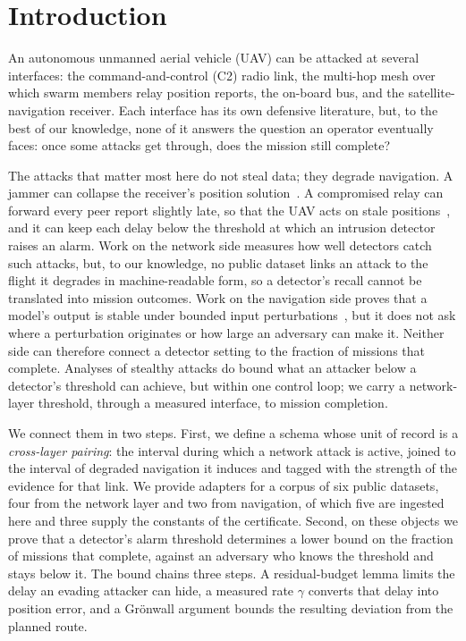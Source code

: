 \documentclass[conference,letterpaper,10pt]{IEEEtran}   %
\begin{document}
\section{Introduction}
\label{sec:intro}
An autonomous unmanned aerial vehicle (UAV) can be attacked at several
interfaces: the command-and-control (C2) radio link, the multi-hop mesh over
which swarm members relay position reports, the on-board bus, and the
satellite-navigation receiver. Each interface has its own defensive literature,
but, to the best of our knowledge, none of it answers the question an operator
eventually faces: once some attacks get through, does the mission still
complete?

The attacks that matter most here do not steal data; they degrade navigation. A
jammer can collapse the receiver's position solution~\cite{kassas2022jammer}. A
compromised relay can forward every peer report slightly late, so that the
UAV acts on stale positions~\cite{datamut2026,lou2019timedelay}, and it can
keep each delay below the threshold at which an intrusion detector raises an
alarm. Work on the network side measures how well detectors catch such attacks,
but, to our knowledge, no public dataset links an attack to the flight it
degrades in machine-readable form, so a detector's recall cannot be translated
into mission outcomes. Work on the navigation side proves that a model's output
is stable under bounded input perturbations~\cite{cohen2019smoothing}, but it
does not ask where a perturbation originates or how large an adversary can make
it. Neither side can therefore connect a detector setting to the fraction of
missions that complete. Analyses of stealthy attacks do bound what an attacker
below a detector's threshold can achieve, but within one control loop; we carry
a network-layer threshold, through a measured interface, to mission completion.

We connect them in two steps. First, we define a schema whose unit of record is
a \emph{cross-layer pairing}: the interval during which a network attack is
active, joined to the interval of degraded navigation it induces and tagged with
the strength of the evidence for that link. We provide adapters for a corpus of
six public datasets, four from the network layer and two from navigation, of
which five are ingested here and three supply the constants of the certificate. Second, on these objects we prove
that a detector's alarm threshold determines a lower bound on the fraction of
missions that complete, against an adversary who knows the threshold and stays
below it. The bound chains three steps. A residual-budget lemma limits the delay
an evading attacker can hide, a measured rate $\gamma$ converts that delay into
position error, and a Gr\"onwall argument bounds the resulting deviation from
the planned route.
\end{document}
